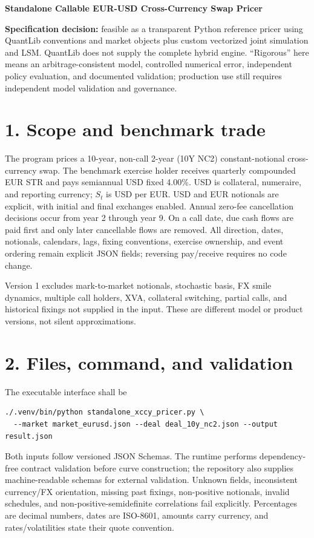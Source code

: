 \documentclass[9pt,letterpaper]{extarticle}
\begin{document}
{\Large\bfseries\color{QuantNavy} Standalone Callable EUR-USD Cross-Currency Swap Pricer}

\vspace{1pt}
{\bfseries Specification decision:} feasible as a transparent Python reference pricer using QuantLib conventions and market objects plus custom vectorized joint simulation and LSM. QuantLib does not supply the complete hybrid engine. ``Rigorous'' here means an arbitrage-consistent model, controlled numerical error, independent policy evaluation, and documented validation; production use still requires independent model validation and governance.

\section{1. Scope and benchmark trade}

The program prices a 10-year, non-call 2-year (10Y NC2) constant-notional cross-currency swap. The benchmark exercise holder receives quarterly compounded EUR \texteuro STR and pays semiannual USD fixed 4.00\%. USD is collateral, numeraire, and reporting currency; $S_t$ is USD per EUR. USD and EUR notionals are explicit, with initial and final exchanges enabled. Annual zero-fee cancellation decisions occur from year 2 through year 9. On a call date, due cash flows are paid first and only later cancellable flows are removed. All direction, dates, notionals, calendars, lags, fixing conventions, exercise ownership, and event ordering remain explicit JSON fields; reversing pay/receive requires no code change.

Version 1 excludes mark-to-market notionals, stochastic basis, FX smile dynamics, multiple call holders, XVA, collateral switching, partial calls, and historical fixings not supplied in the input. These are different model or product versions, not silent approximations.

\section{2. Files, command, and validation}

The executable interface shall be
\begin{lstlisting}
./.venv/bin/python standalone_xccy_pricer.py \
  --market market_eurusd.json --deal deal_10y_nc2.json --output result.json
\end{lstlisting}
Both inputs follow versioned JSON Schemas. The runtime performs dependency-free contract validation before curve construction; the repository also supplies machine-readable schemas for external validation. Unknown fields, inconsistent currency/FX orientation, missing past fixings, non-positive notionals, invalid schedules, and non-positive-semidefinite correlations fail explicitly. Percentages are decimal numbers, dates are ISO-8601, amounts carry currency, and rates/volatilities state their quote convention.
\end{document}
